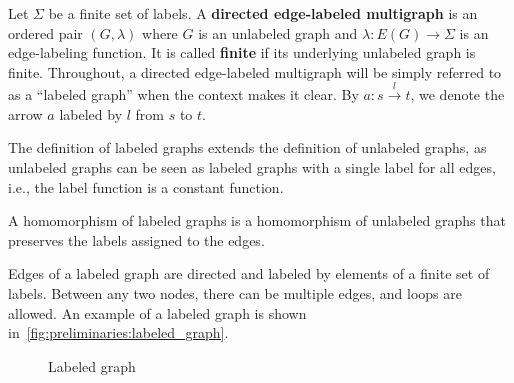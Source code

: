 \begin{definition} 
    \label{def:graph}
    Let \(\Sigma\) be a finite set of labels. A \textbf{directed edge-labeled multigraph} is an ordered pair \((G,\lambda)\) where \( G \) is an unlabeled graph and \( \lambda : E(G) \rightarrow \Sigma\) is an edge-labeling function. 
    It is called \textbf{finite} if its underlying unlabeled graph is finite.
    Throughout, a directed edge-labeled multigraph will be simply referred to as a \enquote{labeled graph} when the context makes it clear.
     By $a : s\overset{l}{\rightarrow} t$, we denote the arrow $a$ labeled by $l$ from $s$ to $t$.
\end{definition}
 The definition of labeled graphs extends the definition of unlabeled graphs, as unlabeled graphs can be seen as labeled graphs with a single label for all edges, i.e., the label function is a constant function.

  A homomorphism of labeled graphs is a homomorphism of unlabeled graphs that preserves the labels assigned to the edges. 
\begin{example}
    Edges of a labeled graph are directed and labeled by elements of a finite set of labels. Between any two nodes, there can be multiple edges, and loops are allowed. An example of a labeled graph is shown in~\autoref{fig:preliminaries:labeled_graph}.
    \begin{figure}[!ht]
       \centering
        \caption{Labeled graph}
        \label{fig:preliminaries:labeled_graph}
    \end{figure}

\end{example}